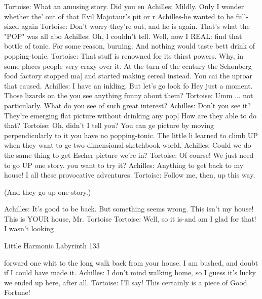                Tortoise: What an amusing story. Did you en
               Achilles: Mildly. Only I wonder whether the' out of that Evil Majotaur's
                      pit or r Achilles-he wanted to be full-sized again
               Tortoise: Don't worry-they're out, and he is again. That's what the "POP"
                      was all abo
               Achilles: Oh, I couldn't tell. Well, now I REAL: find that bottle of tonic.
                      For some reason, burning. And nothing would taste bett drink of
                      popping-tonic.
               Tortoise: That stuff is renowned for its thirst powers. Why, in some
                      places people very crazy over it. At the turn of the century the
                      Schonberg food factory stopped ma] and started making cereal
                      instead. You cai the uproar that caused.
               Achilles: I have an inkling. But let's go look fo Hey just a moment.
                      Those lizards on the you see anything funny about them?
               Tortoise: Umm ... not particularly. What do you see of such great
                      interest?
               Achilles: Don't you see it? They're emerging flat picture without
                      drinking any pop] How are they able to do that?
               Tortoise: Oh, didn't I tell you? You can ge picture by moving
                      perpendicularly to it you have no popping-tonic. The little li
                      learned to climb UP when they want to ge two-dimensional
                      sketchbook world.
               Achilles: Could we do the same thing to get Escher picture we're in?
               Tortoise: Of course! We just need to go UP one story. you want to try it?
               Achilles: Anything to get back to my house! I all these provocative
                      adventures.
               Tortoise: Follow me, then, up this way.

                     (And they go up one story.)

               Achilles: It's good to be back. But something seems wrong. This isn't my
                      house! This is YOUR house, Mr. Tortoise
               Tortoise: Well, so it is-and am I glad for that! I wasn’t looking




Little Harmonic Labyrinth                                                             133

                 forward one whit to the long walk back from your house. I am bushed,
                 and doubt if I could have made it.
               Achilles: I don't mind walking home, so I guess it's lucky we ended up
                      here, after all.
               Tortoise: I'll say! This certainly is a piece of Good Fortune!





